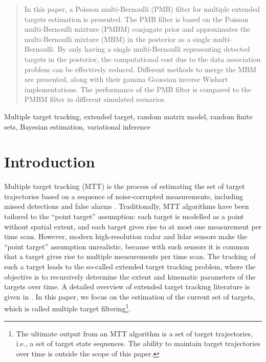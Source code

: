 \documentclass[journal]{IEEEtran}
\begin{document}
\begin{abstract}
In this paper, a Poisson multi-Bernoulli (PMB) filter for multiple extended targets estimation is presented. The PMB filter is based on the Poisson multi-Bernoulli mixture (PMBM) conjugate prior and approximates the multi-Bernoulli mixture (MBM) in the posterior as a single multi-Bernoulli. By only having a single multi-Bernoulli representing detected targets in the posterior, the computational cost due to the data association problem can be effectively reduced. Different methods to merge the MBM are presented, along with their gamma Gaussian inverse Wishart implementations. The performance of the PMB filter is compared to the PMBM filter in different simulated scenarios. 
\end{abstract}

\begin{IEEEkeywords}
Multiple target tracking, extended target, random matrix model, random finite sets, Bayesian estimation, variational inference
\end{IEEEkeywords}

\section{Introduction}
Multiple target tracking (MTT) is the process of estimating the set of target trajectories based on a sequence of noise-corrupted measurements, including missed detections and false alarms \cite{mtt}. Traditionally, MTT algorithms have been tailored to the ``point target'' assumption: each target is modelled as a point without spatial extent, and each target gives rise to at most one measurement per time scan. However, modern high-resolution radar and lidar sensors make the “point target” assumption unrealistic, because with such sensors it is common that a target gives rise to multiple measurements per time scan. The tracking of such a target leads to the so-called extended target tracking problem, where the objective is to recursively determine the extent and kinematic parameters of the targets over time. A detailed overview of extended target tracking literature is given in \cite{extendedoverview}. In this paper, we focus on the estimation of the current set of targets, which is called multiple target filtering\footnote{The ultimate output from an MTT algorithm is a set of target trajectories, i.e., a set of target state sequences. The ability to maintain target trajectories over time is outside the scope of this paper.}. 
\end{document}
